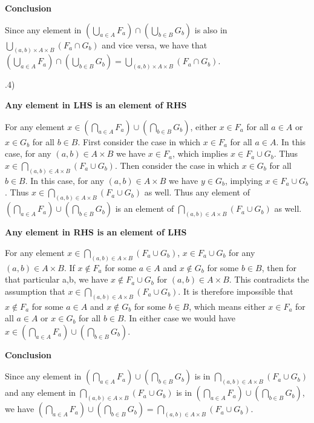 \documentclass{article}
\begin{document}
\bigskip
\textbf{Conclusion}
\medskip

Since any element in $(\bigcup_{a \in A}F_a) \cap (\bigcup_{b \in B}G_b)$ is also in $\bigcup_{(a,b) \times A \times B}(F_a \cap G_b)$ and vice versa, we have that $(\bigcup_{a \in A}F_a) \cap (\bigcup_{b \in B}G_b) = \bigcup_{(a,b) \times A \times B}(F_a \cap G_b)$.

.4)

\medskip
\textbf{Any element in LHS is an element of RHS}
\medskip

For any element $x \in (\bigcap_{a \in A} F_a) \cup (\bigcap_{b \in B} G_b)$, either $x \in F_a$ for all $a \in A$ or $x \in G_b$ for all $b \in B$. First consider the case in which $x \in F_a$ for all $a \in A$. In this case, for any $(a,b) \in A \times B$ we have $x \in F_a$, which implies $x \in F_a \cup G_b$. Thus $x \in \bigcap_{(a,b) \in A \times B} (F_a \cup G_b)$.
Then consider the case in which $x \in G_b$ for all $b \in B$. In this case, for any $(a,b) \in A \times B$ we have $y \in G_b$, implying $x \in F_a \cup G_b$. Thus $x \in \bigcap_{(a,b) \in A \times B}(F_a \cup G_b)$ as well. Thus any element of $(\bigcap_{a \in A} F_a) \cup (\bigcap_{b \in B} G_b)$ is an element of $\bigcap_{(a,b) \in A \times B} (F_a \cup G_b)$ as well.

\medskip
\textbf{Any element in RHS is an element of LHS}
\medskip

For any element $x \in \bigcap_{(a,b) \in A \times B} (F_a \cup G_b)$, $x \in F_a \cup G_b$ for any $(a,b) \in A \times B$. If $x \notin F_a$ for some $a \in A$ and $x \notin G_b$ for some $b \in B$, then for that particular a,b, we have $x \notin F_a \cup G_b$ for $(a,b) \in A \times B$. This contradicts the assumption that $x \in \bigcap_{(a,b) \in A \times B} (F_a \cup G_b)$. It is therefore impossible that $x \notin F_a$ for some $a \in A$ and $x \notin G_b$ for some $b \in B$, which means either $x \in F_a$ for all $a \in A$ or $x \in G_b$ for all $b \in B$. In either case we would have $x \in (\bigcap_{a \in A}F_a) \cup (\bigcap_{b \in B}G_b)$.

\medskip
\textbf{Conclusion}
\medskip

Since any element in $(\bigcap_{a \in A} F_a) \cup (\bigcap_{b \in B} G_b)$ is in $\bigcap_{(a,b) \in A \times B} (F_a \cup G_b)$ and any element in $\bigcap_{(a,b) \in A \times B} (F_a \cup G_b)$ is in $(\bigcap_{a \in A}F_a) \cup (\bigcap_{b \in B}G_b)$, we have $(\bigcap_{a \in A} F_a) \cup (\bigcap_{b \in B} G_b) =  \bigcap_{(a,b) \in A \times B} (F_a \cup G_b)$.
\end{document}
